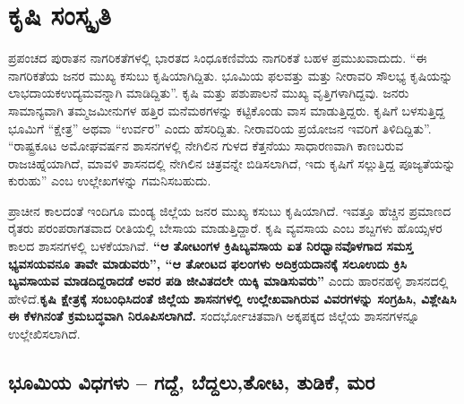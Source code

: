 \chapter{ಕೃಷಿ ಸಂಸ್ಕೃತಿ}

\vskip 4pt

ಪ್ರಪಂಚದ ಪುರಾತನ ನಾಗರಿಕತೆಗಳಲ್ಲಿ ಭಾರತದ ಸಿಂಧೂಕಣಿವೆಯ ನಾಗರಿಕತೆ ಬಹಳ ಪ್ರಮುಖವಾದುದು. “ಈ ನಾಗರಿಕತೆಯ ಜನರ ಮುಖ್ಯ ಕಸುಬು ಕೃಷಿಯಾಗಿದ್ದಿತು. ಭೂಮಿಯ ಫಲವತ್ತು ಮತ್ತು ನೀರಾವರಿ ಸೌಲಭ್ಯ ಕೃಷಿಯನ್ನು ಲಾಭದಾಯಕ\break ಉದ್ಯಮವನ್ನಾಗಿ ಮಾಡಿದ್ದಿತು”. ಕೃಷಿ ಮತ್ತು ಪಶುಪಾಲನೆ ಮುಖ್ಯ ವೃತ್ತಿಗಳಾಗಿದ್ದವು. ಜನರು ಸಾಮಾನ್ಯವಾಗಿ ತಮ್ಮ\break ಜಮೀನುಗಳ ಹತ್ತಿರ ಮನೆಮಠಗಳನ್ನು ಕಟ್ಟಿಕೊಂಡು ವಾಸ ಮಾಡುತ್ತಿದ್ದರು. ಕೃಷಿಗೆ ಬಳಸುತ್ತಿದ್ದ ಭೂಮಿಗೆ “ಕ್ಷೇತ್ರ” ಅಥವಾ “ಉರ್ವರ” ಎಂದು ಹೆಸರಿದ್ದಿತು. ನೀರಾವರಿಯ ಪ್ರಯೋಜನ ಇವರಿಗೆ ತಿಳಿದಿದ್ದಿತು”. “ರಾಷ್ಟ್ರಕೂಟ ಅಮೋಘವರ್ಷನ ಶಾಸನಗಳಲ್ಲಿ ನೇಗಿಲಿನ ಗುಳದ ಕೆತ್ತನೆಯು ಸಾಧಾರಣವಾಗಿ ಕಾಣಬರುವ ರಾಜಚಿಹ್ನೆಯಾಗಿದೆ, ಮಾವಳಿ ಶಾಸನದಲ್ಲಿ ನೇಗಿಲಿನ ಚಿತ್ರವನ್ನೇ ಬಿಡಿಸಲಾಗಿದೆ, ಇದು ಕೃಷಿಗೆ ಸಲ್ಲುತ್ತಿದ್ದ ಪೂಜ್ಯತೆಯನ್ನು ಕುರುಹು” ಎಂಬ ಉಲ್ಲೇಖಗಳನ್ನು ಗಮನಿಸಬಹುದು.

ಪ್ರಾಚೀನ ಕಾಲದಂತೆ ಇಂದಿಗೂ ಮಂಡ್ಯ ಜಿಲ್ಲೆಯ ಜನರ ಮುಖ್ಯ ಕಸುಬು ಕೃಷಿಯಾಗಿದೆ. ಇವತ್ತೂ ಹೆಚ್ಚಿನ ಪ್ರಮಾಣದ ರೈತರು ಪರಂಪರಾಗತವಾದ ರೀತಿಯಲ್ಲಿ ಬೇಸಾಯ ಮಾಡುತ್ತಿದ್ದಾರೆ. ಕೃಷಿ ವ್ಯವಸಾಯ ಎಂಬ ಶಬ್ದಗಳು ಹೊಯ್ಸಳರ ಕಾಲದ ಶಾಸನಗಳಲ್ಲಿ ಬಳಕೆಯಾಗಿವೆ. \textbf{“ಆ ತೋಟಂಗಳ ಕ್ರಿಷಿಬ್ಯವಸಾಯ ಏತ ನಿರಧ್ವಾನವೊಳಗಾದ ಸಮಸ್ತ ಭ್ಯವಸಯವನೂ ತಾವೇ ಮಾಡುವರು”, “ಆ ತೋಂಟದ ಫಲಂಗಳು ಅದಿಕ್ರಯದಾನಕ್ಕೆ ಸಲೂಉದು ಕ್ರಿಸಿ ಬ್ಯವಸಾಯವ ಮಾಡದಿದ್ದರಾದಡೆ ಅವರ ಪಡಿ ಜೀವಿತದಲೇ ಯಿಕ್ಕಿ ಮಾಡಿಸುವರು”} ಎಂದು ಹಾರನಹಳ್ಳಿ ಶಾಸನದಲ್ಲಿ ಹೇಳಿದೆ.\textbf{ಕೃಷಿ ಕ್ಷೇತ್ರಕ್ಕೆ ಸಂಬಂಧಿಸಿದಂತೆ ಜಿಲ್ಲೆಯ ಶಾಸನಗಳಲ್ಲಿ ಉಲ್ಲೇಖವಾಗಿರುವ ವಿವರಗಳನ್ನು ಸಂಗ್ರಹಿಸಿ, ವಿಶ್ಲೇಷಿಸಿ ಈ ಕೆಳಗಿನಂತೆ ಕ್ರಮಬದ್ಧವಾಗಿ ನಿರೂಪಿಸಲಾಗಿದೆ.} ಸಂದರ್ಭೋಚಿತವಾಗಿ ಅಕ್ಕಪಕ್ಕದ ಜಿಲ್ಲೆಯ ಶಾಸನಗಳನ್ನೂ ಉಲ್ಲೇಖಿಸಲಾಗಿದೆ.

\section*{ಭೂಮಿಯ ವಿಧಗಳು – ಗದ್ದೆ, ಬೆದ್ದಲು,ತೋಟ, ತುಡಿಕೆ, ಮರ}
    


